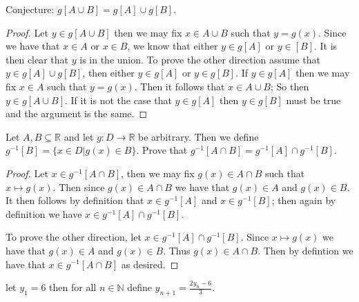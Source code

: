 \documentclass[11pt,largemargins]{homework}
\newcommand{\R}{\mathbb{R}}
\newcommand{\N}{\mathbb{N}}
\begin{document}
\begin{alphaparts}
    Conjecture: $g[A \cup B] = g[A] \cup g[B]$. 

    \begin{proof}
        Let $y \in g[A \cup B]$ then we may fix $x \in A \cup B$ such that $y = g(x)$. Since we have that $x \in A$ or $x \in B$, we know that either $y \in g[A] $ or $y \in [B]$. It is then clear that $y$ is in the union. 
        To prove the other direction assume that $y \in g[A] \cup g[B]$, then either $y \in g[A] $ or $y \in g[B]$. If $y \in g[A]$ then we may fix $x \in A$ such that $y = g(x)$. Then it follows that $x \in A \cup B$; So then $y \in g[A \cup B]$. If it is not the case 
        that $y \in g[A]$ then $y \in g[B]$ must be true and the argument is the same. 
    \end{proof}



\end{alphaparts}

\question
Let $A, B \subseteq \R$ and let $g: D \to \R$ be arbitrary. Then we define $g^{-1}[B] = \{x \in D | g(x) \in B \} $. Prove that $g^{-1}[A \cap B] = g^{-1}[A] \cap g^{-1}[B]$. 

\begin{proof}
    Let $x \in g^{-1}[A \cap B]$, then we may fix $g(x) \in A \cap B$ such that $x \mapsto g(x)$. Then since $g(x) \in A \cap B$ we have that $g(x) \in A $ and $g(x) \in B$. It then follows by definition that 
    $x \in g^{-1}[A] $ and $x \in g^{-1}[B]$; then again by definition we have $x \in g^{-1}[A]  \cap g^{-1}[B]$. 
    
    To prove the other direction, let $x \in  g^{-1}[A]  \cap g^{-1}[B]$. Since $x \mapsto g(x) $ we have that $g(x) \in A$ and $g(x) \in B$. Thus $g(x) \in A \cap B$. Then by defintion we have that $x \in g^{-1}[A \cap B]$ as desired. 
    
\end{proof}

\question
let $y_1 = 6$ then for all $n \in \N$ define $y_{n + 1} = \frac{2y_n - 6}{3}$. 
\end{document}
